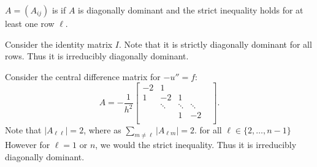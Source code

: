 \documentclass[../main/main.tex]{subfiles}
\begin{document}
\begin{definition}
$A = (A_{ij})$ is  if $A$ is diagonally dominant and the strict inequality holds for at least one row $ \ell$.
\end{definition}

\begin{example}
   Consider the identity matrix $I$. Note that it is strictly diagonally dominant for all rows. Thus it is irreducibly diagonally dominant. 
\end{example}

\begin{example}
    Consider the central difference matrix for $-u'' = f$: \[
        A = -\frac{1}{h^2}\begin{bmatrix} -2 & 1 & & & \\
         1 & -2 & 1 &  \\ 
          & \ddots & \ddots &\ddots  \\ 
          &  & 1 & -2 \\ 
     \end{bmatrix} 
    .\] 
    Note that $|A_{\ell \ell}| = 2$, where as $\sum_{m\neq \ell} |A_{\ell m}| = 2$. for all $\ell \in \{2,\ldots,n-1\}$ However for $\ell = 1$ or $n$, we would the strict inequality. Thus it is irreducibly diagonally dominant.
\end{example}
\end{document}
